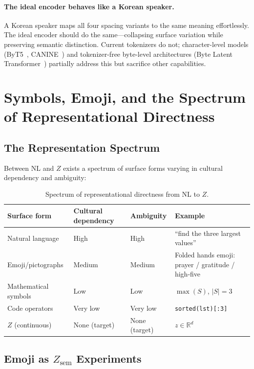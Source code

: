 \documentclass[11pt]{article}
\theoremstyle{definition}
\newcommand{\Zsem}{Z_{\text{sem}}}
\begin{document}
\paragraph{The ideal encoder behaves like a Korean speaker.}
A Korean speaker maps all four spacing variants to the same meaning effortlessly. The ideal encoder should do the same---collapsing surface variation while preserving semantic distinction. Current tokenizers do not; character-level models (ByT5~\cite{xue2022byt5}, CANINE~\cite{clark2022canine}) and tokenizer-free byte-level architectures (Byte Latent Transformer~\cite{pagnoni2024blt}) partially address this but sacrifice other capabilities.

\section{Symbols, Emoji, and the Spectrum of Representational Directness}\label{app:emoji}

\subsection{The Representation Spectrum}

Between NL and $Z$ exists a spectrum of surface forms varying in cultural dependency and ambiguity:

\begin{table}[h]
\centering
\caption{Spectrum of representational directness from NL to $Z$.}
\label{tab:spectrum}
\small
\begin{tabularx}{\textwidth}{l l l L}
\toprule
\textbf{Surface form} & \textbf{Cultural dependency} & \textbf{Ambiguity} & \textbf{Example} \\
\midrule
Natural language & High & High & ``find the three largest values'' \\
Emoji/pictographs & Medium & Medium & Folded hands emoji: prayer / gratitude / high-five \\
Mathematical symbols & Low & Low & $\max(S)$, $|S| = 3$ \\
Code operators & Very low & Very low & \texttt{sorted(lst)[:3]} \\
$Z$ (continuous) & None (target) & None (target) & $z \in \mathbb{R}^d$ \\
\bottomrule
\end{tabularx}
\end{table}

\subsection{Emoji as $\Zsem$ Experiments}
\end{document}
